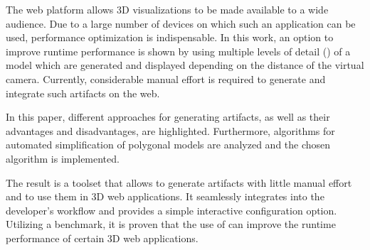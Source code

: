 
The web platform allows 3D visualizations to be made available to a wide audience. Due to a large number of devices on which such an application can be used, performance optimization is indispensable. In this work, an option to improve runtime performance is shown by using multiple levels of detail () of a model which are generated and displayed depending on the distance of the virtual camera. Currently, considerable manual effort is required to generate and integrate such artifacts on the web.

In this paper, different approaches for generating  artifacts, as well as their advantages and disadvantages, are highlighted.
Furthermore, algorithms for automated simplification of polygonal models are analyzed and the chosen algorithm is implemented.

The result is a toolset that allows to generate  artifacts with little manual effort and to use them in 3D web applications.
It seamlessly integrates into the developer's workflow and provides a simple interactive configuration option.
Utilizing a benchmark, it is proven that the use of  can improve the runtime performance of certain 3D web applications.
